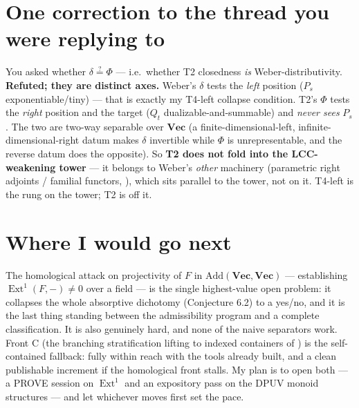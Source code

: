 \documentclass[11pt]{article}
\theoremstyle{plain}
\theoremstyle{definition}
\theoremstyle{remark}
\newcommand{\Vect}{\mathbf{Vec}}
\newcommand{\Add}{\mathrm{Add}}
\DeclareMathOperator{\Ext}{Ext}
\begin{document}
\section{One correction to the thread you were replying to}

You asked whether $\delta\overset{?}{=}\Phi$ --- i.e.\ whether T2 closedness \emph{is}
Weber-distributivity. \textbf{Refuted; they are distinct axes.} Weber's $\delta$ tests the \emph{left}
position ($P_s$ exponentiable/tiny) --- that is exactly my T4-left collapse condition. T2's $\Phi$
tests the \emph{right} position and the target ($Q_t$ dualizable-and-summable) and \emph{never sees}
$P_s$. The two are two-way separable over $\Vect$ (a finite-dimensional-left, infinite-dimensional-right
datum makes $\delta$ invertible while $\Phi$ is unrepresentable, and the reverse datum does the
opposite). So \textbf{T2 does not fold into the LCC-weakening tower} --- it belongs to Weber's
\emph{other} machinery (parametric right adjoints / familial functors, \cite{WeberFamilial}), which
sits parallel to the tower, not on it. T4-left is the rung on the tower; T2 is off it.

\section*{Where I would go next}

The homological attack on projectivity of $F$ in $\Add(\Vect,\Vect)$ --- establishing
$\Ext^1(F,-)\neq 0$ over a field --- is the single highest-value open problem: it collapses the whole
absorptive dichotomy (Conjecture 6.2) to a yes/no, and it is the last thing standing between the
admissibility program and a complete classification. It is also genuinely hard, and none of the naive
separators work. Front C (the branching stratification lifting to indexed containers of \cite{DPUV})
is the self-contained fallback: fully within reach with the tools already built, and a clean
publishable increment if the homological front stalls. My plan is to open both --- a PROVE session on
$\Ext^1$ and an expository pass on the DPUV monoid structures --- and let whichever moves first set the
pace.
\end{document}
